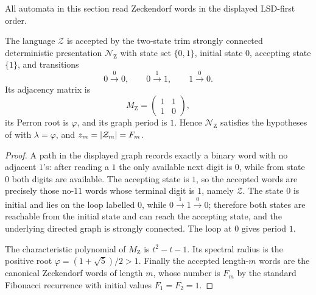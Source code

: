 All automata in this section read Zeckendorf words in the displayed
LSD-first order.

\begin{lemma}
  \label{lem:zeckendorf-canonical-presentation}
  The language \(\mathcal Z\) is accepted by the two-state trim
  strongly connected deterministic presentation \(\mathcal N_{\mathrm Z}\)
  with state set \(\{0,1\}\), initial state \(0\), accepting state
  \(\{1\}\), and transitions
  \[
    0\xrightarrow{0}0,\qquad
    0\xrightarrow{1}1,\qquad
    1\xrightarrow{0}0.
  \]
  Its adjacency matrix is
  \[
    M_{\mathrm Z}=
    \begin{pmatrix}
      1&1\\
      1&0
    \end{pmatrix},
  \]
  its Perron root is \(\varphi\), and its graph period is \(1\). Hence
  \(\mathcal N_{\mathrm Z}\) satisfies the hypotheses of
   with \(\lambda=\varphi\), and
  \(z_m=\lvert \mathcal Z_m \rvert=F_m\).
\end{lemma}

\begin{proof}
  A path in the displayed graph records exactly a binary word with no
  adjacent \(1\)'s: after reading a \(1\) the only available next digit
  is \(0\), while from state \(0\) both digits are available. The
  accepting state is \(1\), so the accepted words are precisely those
  no-\(11\) words whose terminal digit is \(1\), namely
  \(\mathcal Z\). The state \(0\) is initial and lies on the loop
  labelled \(0\), while \(0\xrightarrow{1}1\xrightarrow{0}0\); therefore
  both states are reachable from the initial state and can reach the
  accepting state, and the underlying directed graph is strongly
  connected. The loop at \(0\) gives period \(1\).

  The characteristic polynomial of \(M_{\mathrm Z}\) is
  \(t^2-t-1\). Its spectral radius is the positive root
  \(\varphi=(1+\sqrt5)/2>1\). Finally the accepted length-\(m\) words
  are the canonical Zeckendorf words of length \(m\), whose number is
  \(F_m\) by the standard Fibonacci recurrence with initial values
  \(F_1=F_2=1\).
\end{proof}

